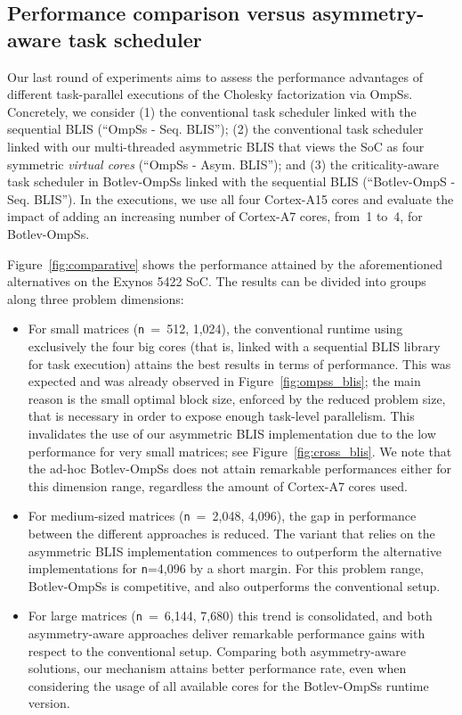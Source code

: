 \subsection{Performance comparison versus asymmetry-aware task scheduler}
\label{sec:comparative}

Our last round of experiments aims to assess the performance advantages of different task-parallel executions
of the Cholesky factorization via OmpSs. Concretely, we consider 
(1) the conventional task scheduler linked with the sequential BLIS (``OmpSs - Seq. BLIS''); 
(2) the conventional task scheduler linked with our multi-threaded asymmetric BLIS that views the SoC as four symmetric {\em virtual cores}
(``OmpSs - Asym. BLIS''); and 
(3) the criticality-aware task scheduler in Botlev-OmpSs linked with the sequential BLIS
(``Botlev-OmpS - Seq. BLIS''). 
In the executions, we use all four Cortex-A15 cores and 
evaluate the impact of adding an increasing number of Cortex-A7 cores, from~1 to~4, for Botlev-OmpSs. 

Figure~\ref{fig:comparative} shows the performance attained by the aforementioned alternatives on the Exynos 5422 SoC.
The results can be divided into groups along three problem dimensions:
\begin{itemize}
 \item For small matrices ({\tt n}~=~512, 1,024), the conventional runtime using exclusively the four big cores (that is,
linked with a sequential BLIS library for task execution) attains the best results in terms of performance. This was
expected and was already observed in Figure~\ref{fig:ompss_blis}; the main reason is the small optimal block size,
enforced by the reduced problem size, that is necessary in order to expose enough task-level parallelism. This invalidates the
use of our asymmetric BLIS implementation due to the low performance for very small matrices;
see Figure~\ref{fig:cross_blis}. We note that the ad-hoc Botlev-OmpSs does not attain
remarkable performances either for this dimension range, regardless the amount of Cortex-A7 cores used.

 \item For medium-sized matrices ({\tt n}~=~2,048, 4,096), the gap in performance between the different approaches is reduced. 
The variant that relies on the asymmetric BLIS implementation commences to outperform the alternative implementations for
{\tt n}=4,096 by a short margin. For this problem range, Botlev-OmpSs is competitive, and also outperforms the conventional setup.

 \item For large matrices ({\tt n}~=~6,144, 7,680) this trend is consolidated, and both asymmetry-aware approaches deliver
remarkable performance gains with respect to the conventional setup. Comparing both asymmetry-aware solutions, our
mechanism attains better performance rate, even when considering the usage of all available cores for the Botlev-OmpSs
runtime version.

\end{itemize}

